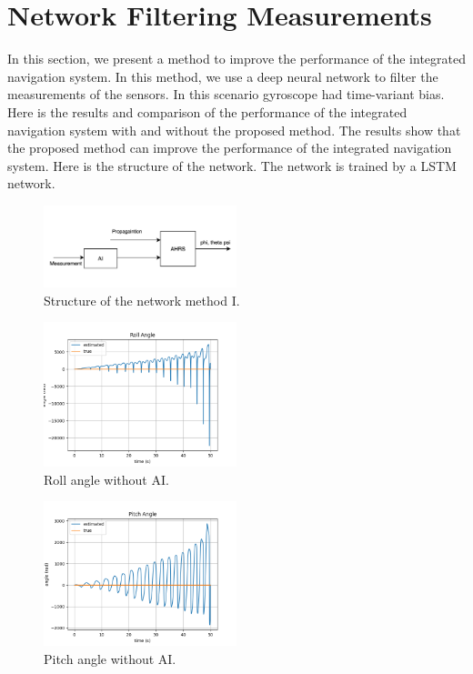 \documentclass[conference]{IEEEtran}
\begin{document}
\section{Network Filtering Measurements}
    In this section, we present a method to improve the performance of the integrated navigation system. In this method, we use a deep neural network to filter the measurements of the sensors. In this scenario gyroscope had time-variant bias. Here is the results and comparison of the performance of the integrated navigation system with and without the proposed method. The results show that the proposed method can improve the performance of the integrated navigation system. Here is the structure of the network. The network is trained by a LSTM network.
    \begin{figure}[H]
        \centerline{\includegraphics[width=0.5\textwidth]{../Figures/part_1_network.png}}
        \caption{Structure of the network method I.}
    \end{figure}
    \begin{figure}[H]
        \centerline{\includegraphics[width=0.5\textwidth]{../Figures/part_1_roll_no_AI.png}}
        \caption{Roll angle without AI.}
    \end{figure}
    \begin{figure}[H]
        \centerline{\includegraphics[width=0.5\textwidth]{../Figures/part_1_pitch_no_AI.png}}
        \caption{Pitch angle without AI.}
    \end{figure}
\end{document}
